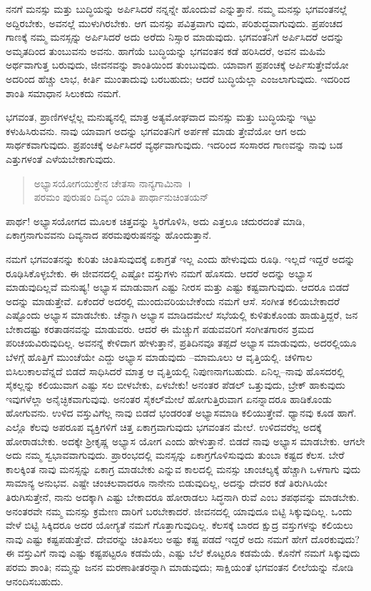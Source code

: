 ನನಗೆ ಮನಸ್ಸು ಮತ್ತು ಬುದ್ಧಿಯನ್ನು ಅರ್ಪಿಸಿದರೆ ನನ್ನನ್ನೇ ಹೊಂದುವೆ ಎನ್ನುತ್ತಾನೆ. ನಮ್ಮ ಮನಸ್ಸು ಭಗವಂತನಲ್ಲೆ ಅದ್ದಿರಬೇಕು, ಅವನಲ್ಲೆ ಮುಳುಗಿರಬೇಕು. ಆಗ ಮನಸ್ಸು ಪವಿತ್ರವಾಗು ವುದು, ಪರಿಶುದ್ಧವಾಗುವುದು. ಪ್ರಪಂಚದ ಗಾಣಕ್ಕೆ ನಮ್ಮ ಮನಸ್ಸನ್ನು ಅರ್ಪಿಸಿದರೆ ಅದು ಅರೆದು ನಿಸ್ಸಾರ ಮಾಡುವುದು. ಭಗವಂತನಿಗೆ ಅರ್ಪಿಸಿದರೆ ಅದನ್ನು ಅಮೃತದಿಂದ ತುಂಬುವನು ಅವನು. ಹಾಗೆಯೆ ಬುದ್ಧಿಯನ್ನು ಭಗವಂತನ ಕಡೆ ಹರಿಸಿದರೆ, ಅವನ ಮಹಿಮೆ ಅರ್ಥವಾಗುತ್ತ ಬರುವುದು, ಜೀವನವನ್ನು ಶಾಂತಿಯಿಂದ ತುಂಬುವುದು. ಯಾವಾಗ ಪ್ರಪಂಚಕ್ಕೆ ಅರ್ಪಿಸುತ್ತೇವೆಯೋ ಅದರಿಂದ ಹೆಚ್ಚು ಲಾಭ, ಕೀರ್ತಿ ಮುಂತಾದುವು ಬರಬಹುದು; ಆದರೆ ಬುದ್ಧಿಯೆಲ್ಲಾ ಎಂಜಲಾಗುವುದು. ಇದರಿಂದ ಶಾಂತಿ ಸಮಾಧಾನ ಸಿಲುಕದು ನಮಗೆ.

ಭಗವಂತ, ಪ್ರಾಣಿಗಳಲ್ಲೆಲ್ಲ ಮನುಷ್ಯನಲ್ಲಿ ಮಾತ್ರ ಅತ್ಯಮೋಘವಾದ ಮನಸ್ಸು ಮತ್ತು ಬುದ್ಧಿಯನ್ನು ಇಟ್ಟು ಕಳುಹಿಸಿರುವನು. ನಾವು ಯಾವಾಗ ಅದನ್ನು ಭಗವಂತನಿಗೆ ಅರ್ಪಣೆ ಮಾಡು ತ್ತೇವೆಯೋ ಆಗ ಅದು ಸಾರ್ಥಕವಾಗುವುದು. ಪ್ರಪಂಚಕ್ಕೆ ಅರ್ಪಿಸಿದರೆ ವ್ಯರ್ಥವಾಗುವುದು. ಇದರಿಂದ ಸಂಸಾರದ ಗಾಣವನ್ನು ನಾವು ಬಡ ಎತ್ತುಗಳಂತೆ ಎಳೆಯಬೇಕಾಗುವುದು.

\begin{verse}
ಅಭ್ಯಾಸಯೋಗಯುಕ್ತೇನ ಚೇತಸಾ ನಾನ್ಯಗಾಮಿನಾ~।\\ಪರಮಂ ಪುರುಷಂ ದಿವ್ಯಂ ಯಾತಿ ಪಾರ್ಥಾನುಚಿಂತಯನ್ 
\end{verse}

{\small ಪಾರ್ಥ! ಅಭ್ಯಾಸಯೋಗದ ಮೂಲಕ ಚಿತ್ತವನ್ನು ಸ್ಥಿರಗೊಳಿಸಿ, ಅದು ಎತ್ತಲೂ ಚದುರದಂತೆ ಮಾಡಿ, ಏಕಾಗ್ರನಾಗುವವನು ದಿವ್ಯನಾದ ಪರಮಪುರುಷನನ್ನು ಹೊಂದುತ್ತಾನೆ.}

ನಮಗೆ ಭಗವಂತನನ್ನು ಕುರಿತು ಚಿಂತಿಸುವುದಕ್ಕೆ ಏಕಾಗ್ರತೆ ಇಲ್ಲ ಎಂದು ಹೇಳುವುದು ರೂಢಿ. ಇಲ್ಲದೆ ಇದ್ದರೆ ಅದನ್ನು ರೂಢಿಸಿಕೊಳ್ಳಬೇಕು. ಈ ಜೀವನದಲ್ಲಿ ಎಷ್ಟೋ ವಸ್ತುಗಳು ನಮಗೆ ಹೊಸದು. ಆದರೆ ಅದನ್ನು ಅಭ್ಯಾಸ ಮಾಡುವುದಿಲ್ಲವೆ ಮನುಷ್ಯ! ಅಭ್ಯಾಸ ಮಾಡುವಾಗ ಎಷ್ಟು ನೀರಸ ಮತ್ತು ಎಷ್ಟು ಕಷ್ಟವಾಗುವುದು. ಆದರೂ ಬಿಡದೆ ಅದನ್ನು ಮಾಡುತ್ತೇವೆ. ಏಕೆಂದರೆ ಅದರಲ್ಲಿ ಮುಂದುವರಿಯಬೇಕೆಂದು ನಮಗೆ ಆಸೆ. ಸಂಗೀತ ಕಲಿಯಬೇಕಾದರೆ ಎಷ್ಟೊಂದು ಅಭ್ಯಾಸ ಮಾಡಬೇಕು. ಚೆನ್ನಾಗಿ ಅಭ್ಯಾಸ ಮಾಡಿದಮೇಲೆ ಸಭೆಯಲ್ಲಿ ಕುಳಿತುಕೊಂಡು ಹಾಡುತ್ತಿದ್ದರೆ, ಜನ ಬೇಕಾದಷ್ಟು ಕರತಾಡನವನ್ನು ಮಾಡುವರು. ಆದರೆ ಈ ಮೆಚ್ಚುಗೆ ಪಡುವವರಿಗೆ ಸಂಗೀತಗಾರನ ಶ್ರಮದ ಪರಿಚಯವಿರುವುದಿಲ್ಲ. ಅವನನ್ನೆ ಕೇಳಿದಾಗ ಹೇಳುತ್ತಾನೆ, ಪ್ರತಿದಿನವೂ ತಪ್ಪದೆ ಅಭ್ಯಾಸ ಮಾಡುವುದು, ಅದರಲ್ಲಿಯೂ ಬೆಳಗ್ಗೆ ಹೊತ್ತಿಗೆ ಮುಂಚೆಯೇ ಎದ್ದು ಅಭ್ಯಾಸ ಮಾಡುವುದು –ಮಾಮೂಲು ಆ ವೃತ್ತಿಯಲ್ಲಿ. ಚಳಿಗಾಲ ಬಿಸಿಲುಕಾಲವೆನ್ನದೆ ಬಿಡದೆ ಸಾಧಿಸಿದರೆ ಮಾತ್ರ ಆ ವೃತ್ತಿಯಲ್ಲಿ ನಿಪುಣನಾಗಬಹುದು. ಏನಿಲ್ಲ–ನಾವು ಹೊಸದರಲ್ಲಿ ಸೈಕಲ್ಲನ್ನು ಕಲಿಯುವಾಗ ಎಷ್ಟು ಸಲ ಬೀಳಬೇಕು, ಏಳಬೇಕು! ಅನಂತರ ಪೆಡಲ್ ಒತ್ತುವುದು, ಬ್ರೇಕ್ ಹಾಕುವುದು ಇವುಗಳೆಲ್ಲಾ ಅನೈಚ್ಛಿಕವಾಗುವುವು. ಅನಂತರ ಸೈಕಲ್​ಮೇಲೆ ಹೋಗುತ್ತಿರುವಾಗ ಏನನ್ನಾದರೂ ಹಾಡಿಕೊಂಡು ಹೋಗುವನು. ಉಳಿದ ವಸ್ತುವಿಗೆಲ್ಲ ನಾವು ಬಿಡದೆ ಭಂಡರಂತೆ ಅಭ್ಯಾಸಮಾಡಿ ಕಲಿಯುತ್ತೇವೆ. ಧ್ಯಾನವು ಕೂಡ ಹಾಗೆ. ಎಲ್ಲೊ ಕೆಲವು ಅಪರೂಪ ವ್ಯಕ್ತಿಗಳಿಗೆ ಚಿತ್ತ ಏಕಾಗ್ರವಾಗುವುದು ಭಗವಂತನ ಮೇಲೆ. ಉಳಿದವರೆಲ್ಲ ಅದಕ್ಕೆ ಹೋರಾಡಬೇಕು. ಅದಕ್ಕೇ ಶ‍್ರೀಕೃಷ್ಣ ಅಭ್ಯಾಸ ಯೋಗ ಎಂದು ಹೇಳುತ್ತಾನೆ. ಬಿಡದೆ ನಾವು ಅಭ್ಯಾಸ ಮಾಡಬೇಕು. ಆಗಲೇ ಅದು ನಮ್ಮ ಸ್ವಭಾವವಾಗುವುದು. ಪ್ರಾರಂಭದಲ್ಲಿ ಮನಸ್ಸನ್ನು ಏಕಾಗ್ರಗೊಳಿಸುವುದು ತುಂಬಾ ಕಷ್ಟದ ಕೆಲಸ. ಬೇರೆ ಕಾಲಕ್ಕಿಂತ ನಾವು ಮನಸ್ಸನ್ನು ಏಕಾಗ್ರ ಮಾಡಬೇಕು ಎನ್ನುವ ಕಾಲದಲ್ಲಿ ಮನಸ್ಸು ಚಾಂಚಲ್ಯಕ್ಕೆ ಹೆಚ್ಚಾಗಿ ಒಳಗಾಗು ವುದು ಸಾಮಾನ್ಯ ಅನುಭವ. ಎಷ್ಟೇ ಚಂಚಲವಾದರೂ ನಾನೇನು ಬಿಡುವುದಿಲ್ಲ, ಅದನ್ನು ದೇವರ ಕಡೆ ತಿರುಗಿಸಿಯೇ ತಿರುಗಿಸುತ್ತೇನೆ, ನಾನು ಅದಕ್ಕಾಗಿ ಎಷ್ಟು ಬೇಕಾದರೂ ಹೋರಾಡಲು ಸಿದ್ಧನಾಗಿ ರುವೆ ಎಂಬ ಶಪಥವನ್ನು ಮಾಡಬೇಕು. ಅನಂತರವೇ ನಮ್ಮ ಮನಸ್ಸು ಕ್ರಮೇಣ ದಾರಿಗೆ ಬರಬೇಕಾದರೆ. ಜೀವನದಲ್ಲಿ ಯಾವುದೂ ಬಿಟ್ಟಿ ಸಿಕ್ಕುವುದಿಲ್ಲ. ಒಂದು ವೇಳೆ ಬಿಟ್ಟಿ ಸಿಕ್ಕಿದರೂ ಅದರ ಯೋಗ್ಯತೆ ನಮಗೆ ಗೊತ್ತಾಗುವುದಿಲ್ಲ. ಕೆಲಸಕ್ಕೆ ಬಾರದ ಕ್ಷುದ್ರ ವಸ್ತುಗಳನ್ನು ಕಲಿಯಲು ನಾವು ಎಷ್ಟು ಕಷ್ಟಪಡುತ್ತೇವೆ. ದೇವರನ್ನು ಚಿಂತಿಸಲು ಅಷ್ಟು ಕಷ್ಟ ಪಡದೆ ಇದ್ದರೆ ಅದು ನಮಗೆ ಹೇಗೆ ದೊರಕುವುದು? ಈ ವಸ್ತುವಿಗೆ ನಾವು ಎಷ್ಟು ಕಷ್ಟಪಟ್ಟರೂ ಕಡಮೆಯೆ, ಎಷ್ಟು ಬೆಲೆ ಕೊಟ್ಟರೂ ಕಡಮೆಯೆ. ಕೊನೆಗೆ ನಮಗೆ ಸಿಕ್ಕುವುದು ಪರಮ ಶಾಂತಿ; ನಮ್ಮನ್ನು ಜನನ ಮರಣಾತೀತರನ್ನಾಗಿ ಮಾಡುವುದು; ಸಾಕ್ಷಿಯಂತೆ ಭಗವಂತನ ಲೀಲೆಯನ್ನು ನೋಡಿ ಆನಂದಿಸಬಹುದು.


